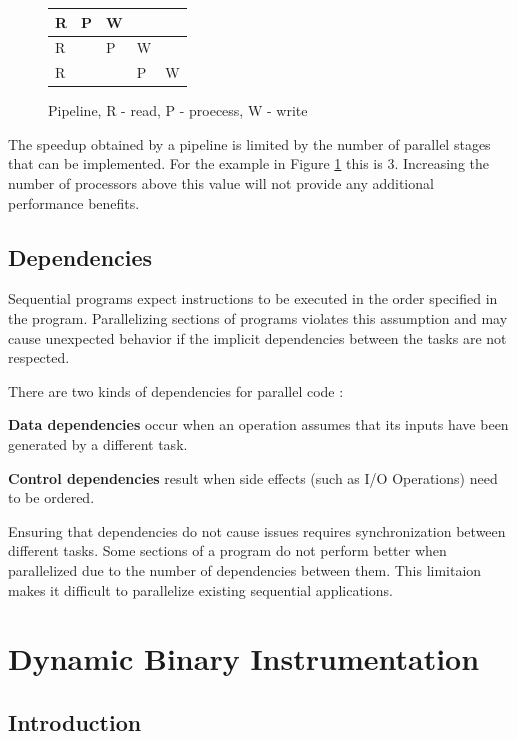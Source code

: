\begin{figure}[!ht]
	\centering
	\begin{tabular}{ l | l | l | l | l}
		R & P & W & & \\
		\hline
		R &  & P & W & \\
		\hline
		R &  & & P & W \\
	\end{tabular}
	\caption{Pipeline, R - read, P - proecess, W - write}
	\label{cap2:pipeline}
\end{figure}

The speedup obtained by a pipeline is limited by the number of parallel stages that can be implemented. For the example in Figure \ref{cap2:pipeline} this is 3. Increasing the number of processors above this value will not provide any additional performance benefits.

\subsection{Dependencies}
\label{cap2:dependencies}

Sequential programs expect instructions to be executed in the order specified in the program. Parallelizing sections of programs violates this assumption and may cause unexpected behavior if the implicit dependencies between the tasks are not respected.

There are two kinds of dependencies for parallel code \cite{parbook}:

\textbf{Data dependencies} occur when an operation assumes that its inputs have been generated by a different task.

\textbf{Control dependencies} result when side effects (such as I/O Operations) need to be ordered.

Ensuring that dependencies do not cause issues requires synchronization between different tasks. Some sections of a program do not perform better when parallelized due to the number of dependencies between them. This limitaion makes it difficult to parallelize existing sequential applications.

\section {Dynamic Binary Instrumentation}

\subsection{Introduction}

